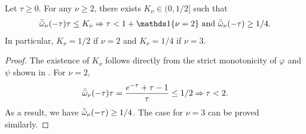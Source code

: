 \begin{corollary}\label{cor:K_nu}
    Let $\tau \ge 0$.
    For any $\nu \ge 2$, there exists $K_\nu \in (0, 1/2]$ such that
    \begin{align*}
        \bbar{\omega}_\nu(-\tau) \tau \le K_\nu \Rightarrow \tau < 1 + \ind\{\nu = 2\} \mbox{ and } \bbar{\omega}_\nu(-\tau) \ge 1/4.
    \end{align*}
    In particular, $K_\nu = 1/2$ if $\nu = 2$ and $K_\nu = 1/4$ if $\nu = 3$.
\end{corollary}
\begin{proof}
    The existence of $K_\nu$ follows directly from the strict monotonicity of $\varphi$ and $\psi$ shown in .
    For $\nu = 2$,
    \begin{align*}
        \bar{\bar{\omega}}_\nu(-\tau) \tau = \frac{e^{-\tau} + \tau - 1}{\tau} \le 1/2 \Rightarrow \tau < 2.
    \end{align*}
    As a result, we have $\bar{\bar{\omega}}_\nu(-\tau) \ge 1/4$.
    The case for $\nu = 3$ can be proved similarly.
\end{proof}

